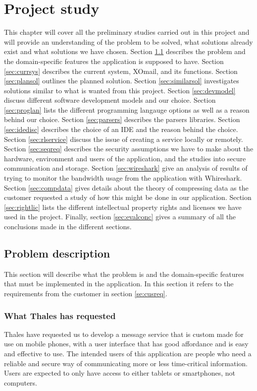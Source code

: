 \chapter{Project study}
This chapter will cover all the preliminary studies carried out in this project and will provide an understanding of the problem to be solved, what solutions already exist and what solutions we have chosen. Section \ref{sec:probdesc} describes the problem and the domain-specific features the application is supposed to have. Section \ref{sec:currsys} describes the current system, XOmail, and its functions. Section \ref{sec:plansol} outlines the planned solution. Section \ref{sec:similarsol} investigates solutions similar to what is wanted from this project. Section \ref{sec:devmodel} discuss different software development models and our choice. Section \ref{sec:proglan} lists the different programming langauge options as well as a reason behind our choice. Section \ref{sec:parsers} describes the parsers libraries. Section \ref{sec:idedisc} describes the choice of an IDE and the reason behind the choice. Section \ref{sec:rlservice} discuss the issue of creating a service locally or remotely. Section \ref{sec:seqreq} describes the security assumptions we have to make about the hardware, environment and users of the application, and the studies into secure communication and storage. Section \ref{sec:wireshark} give an analysis of results of trying to monitor the bandwidth usage from the application with Whireshark. Section \ref{sec:compdata} gives details about the theory of compressing data as the customer requested a study of how this might be done in our application. Section \ref{sec:rightlic} lists the different intellectual property rights and licenses we have used in the project. Finally, section \ref{sec:evalconc} gives a summary of all the conclusions made in the different sections.

\section{Problem description}\label{sec:probdesc}

This section will describe what the problem is and the domain-specific features that must be implemented in the application. In this section it refers to the requirements from the customer in section \ref{se:cusreq}.

\subsection{What Thales has requested}
Thales have requested us to develop a message service that is custom made for use on mobile phones, with a user interface that has good affordance and is easy and effective to use.
\newline
\newline
The intended users of this application are people who need a reliable and secure way of communicating more or less time-critical information. Users are expected to only have access to either tablets or smartphones, not computers.

